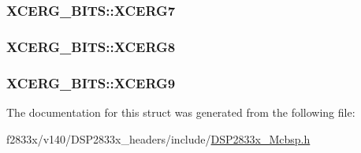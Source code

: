 \subsubsection[{X\+C\+E\+R\+G7}]{ X\+C\+E\+R\+G\+\_\+\+B\+I\+T\+S\+::\+X\+C\+E\+R\+G7}\label{struct_x_c_e_r_g___b_i_t_s_acaa8467fcfd5d28531ee96152f098fbe}
\hypertarget{struct_x_c_e_r_g___b_i_t_s_ab0d504d9c7b3502b9d6e42de48d4a7cb}{}
\subsubsection[{X\+C\+E\+R\+G8}]{ X\+C\+E\+R\+G\+\_\+\+B\+I\+T\+S\+::\+X\+C\+E\+R\+G8}\label{struct_x_c_e_r_g___b_i_t_s_ab0d504d9c7b3502b9d6e42de48d4a7cb}
\hypertarget{struct_x_c_e_r_g___b_i_t_s_a72f86f35b63523c803b483d8c8201f0b}{}
\subsubsection[{X\+C\+E\+R\+G9}]{ X\+C\+E\+R\+G\+\_\+\+B\+I\+T\+S\+::\+X\+C\+E\+R\+G9}\label{struct_x_c_e_r_g___b_i_t_s_a72f86f35b63523c803b483d8c8201f0b}


The documentation for this struct was generated from the following file\+:\begin{DoxyCompactItemize}
\item 
f2833x/v140/\+D\+S\+P2833x\+\_\+headers/include/\hyperlink{_d_s_p2833x___mcbsp_8h}{D\+S\+P2833x\+\_\+\+Mcbsp.\+h}\end{DoxyCompactItemize}

